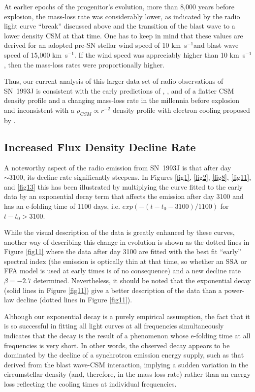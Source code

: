 \documentclass[12pt,preprint]{aastex}
\newcommand{\kms}{km~s$^{-1}$}
\begin{document}
At earlier epochs of the progenitor's evolution, more than 8,000 years before explosion, the mass-loss rate was considerably lower, as indicated by the radio light curve ``break'' discussed above and the transition of the blast wave to a lower density CSM at that time.  One has to keep in mind that these values are derived for an adopted pre-SN stellar wind speed of 10 \kms and blast wave speed of 15,000 \kms.  If the wind speed was appreciably higher than 10 \kms, then the mass-loss rates were proportionally higher.

Thus, our current analysis of this larger data set of radio observations of SN~1993J is consistent with the early predictions of \citet{VanDyk94}, \citet{Immler01}, and \citet{Zimmermann03} of a flatter
CSM density profile and a changing mass-loss rate in the millennia before explosion and inconsistent with a $\rho_{CSM} \propto  r^{-2}$ density profile with electron cooling proposed by \cite{Fransson98}.

\subsection{Increased Flux Density Decline Rate}

A noteworthy aspect of the radio emission from SN~1993J is that after
day $\sim3100$, its decline rate significantly steepens. In Figures
\ref{fig1}, \ref{fig2}, \ref{fig8}, \ref{fig11}, and \ref{fig13} this has been illustrated by
multiplying the curve fitted to the early data by an exponential decay term that
affects the emission after  day 3100 and has an e-folding time of 1100
days, i.e. $exp(-(t-t_0-3100)/1100)$ for $t-t_0>3100$.

While the visual description of the data is greatly enhanced by these
curves, another way of describing this change in evolution is shown as
the dotted lines in Figure \ref{fig11} where the data after day 3100 are
fitted with the best fit ``early'' spectral index (the emission is
optically thin at that time, so whether an SSA or FFA model is used at
early times is of no consequence) and a new decline rate $\beta = -2.7$
determined. Nevertheless, it should be noted that the exponential decay
(solid lines in Figure \ref{fig11}) give a better description of the data
than a power-law decline (dotted lines in Figure \ref{fig11}).

Although our exponential decay is a purely empirical assumption, the fact that it is so successful in fitting all light curves at all frequencies simultaneously indicates that the decay is the  result of a
phenomenon whose e-folding time at all frequencies is very short. In other words, the observed decay appears to be dominated by the decline of a synchrotron emission energy supply, such as that derived from the blast wave-CSM interaction, implying a sudden variation in the circumstellar density (and, therefore, in the mass-loss rate) rather than an energy loss reflecting the cooling times at individual frequencies.
\end{document}

